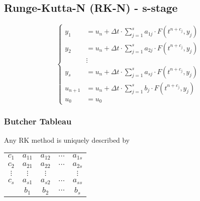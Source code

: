 \subsection{Runge-Kutta-N (RK-N) - s-stage}
    \vspace{-1em}
    $$
        \begin{cases}
            y_1&=u_n+\Delta t \cdot \sum\limits_{j=1}^s a_{1j} \cdot F(t^{n+c_j},y_j)\\
            y_2&=u_n+\Delta t \cdot \sum\limits_{j=1}^s a_{2j} \cdot F(t^{n+c_j},y_j)\\[-1em]
               &\vdots\\[-0.75em]
            y_s&=u_n+\Delta t \cdot \sum\limits_{j=1}^s a_{sj} \cdot F(t^{n+c_j},y_j)\\
            u_{n+1}&=u_n+\Delta t \cdot \sum\limits_{j=1}^s b_j \cdot F(t^{n+c_j},y_j)\\
            u_0&=u_0
        \end{cases}
    $$
    \subsubsection{Butcher Tableau}
        Any RK method is uniquely described by
        \begin{center}
            \begin{tabular}{c|cccc}
                $c_1$&$a_{11}$&$a_{12}$&$\cdots$&$a_{1s}$\\
                $c_2$&$a_{21}$&$a_{22}$&$\cdots$&$a_{2s}$\\
                $\vdots$&$\vdots$&$\vdots$&&$\vdots$\\
                $c_s$&$a_{s1}$&$a_{s2}$&$\cdots$&$a_{ss}$\\\hline
                &$b_1$&$b_2$&$\cdots$&$b_s$            
            \end{tabular}
        \end{center}

